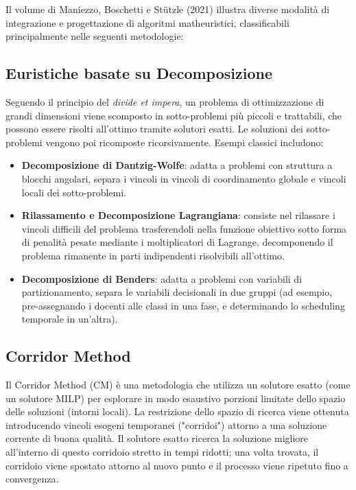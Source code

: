 Il volume di Maniezzo, Boschetti e Stützle (2021) \cite{maniezzo2021matheuristics} illustra diverse modalità di integrazione e progettazione di algoritmi matheuristici, classificabili principalmente nelle seguenti metodologie:

\subsection{Euristiche basate su Decomposizione}
\label{subsec:decomposizione-math}

Seguendo il principio del \textit{divide et impera}, un problema di ottimizzazione di grandi dimensioni viene scomposto in sotto-problemi più piccoli e trattabili, che possono essere risolti all'ottimo tramite solutori esatti. Le soluzioni dei sotto-problemi vengono poi ricomposte ricorsivamente. Esempi classici includono:
\begin{itemize}
    \item \textbf{Decomposizione di Dantzig-Wolfe}: adatta a problemi con struttura a blocchi angolari, separa i vincoli in vincoli di coordinamento globale e vincoli locali dei sotto-problemi.
    \item \textbf{Rilassamento e Decomposizione Lagrangiana}: consiste nel rilassare i vincoli difficili del problema trasferendoli nella funzione obiettivo sotto forma di penalità pesate mediante i moltiplicatori di Lagrange, decomponendo il problema rimanente in parti indipendenti risolvibili all'ottimo.
    \item \textbf{Decomposizione di Benders}: adatta a problemi con variabili di partizionamento, separa le variabili decisionali in due gruppi (ad esempio, pre-assegnando i docenti alle classi in una fase, e determinando lo scheduling temporale in un'altra).
\end{itemize}

\subsection{Corridor Method}
\label{subsec:corridor-method}

Il Corridor Method (CM) \cite{maniezzo2021matheuristics} è una metodologia che utilizza un solutore esatto (come un solutore MILP) per esplorare in modo esaustivo porzioni limitate dello spazio delle soluzioni (intorni locali). La restrizione dello spazio di ricerca viene ottenuta introducendo vincoli esogeni temporanei ("corridoi") attorno a una soluzione corrente di buona qualità. Il solutore esatto ricerca la soluzione migliore all'interno di questo corridoio stretto in tempi ridotti; una volta trovata, il corridoio viene spostato attorno al nuovo punto e il processo viene ripetuto fino a convergenza.

